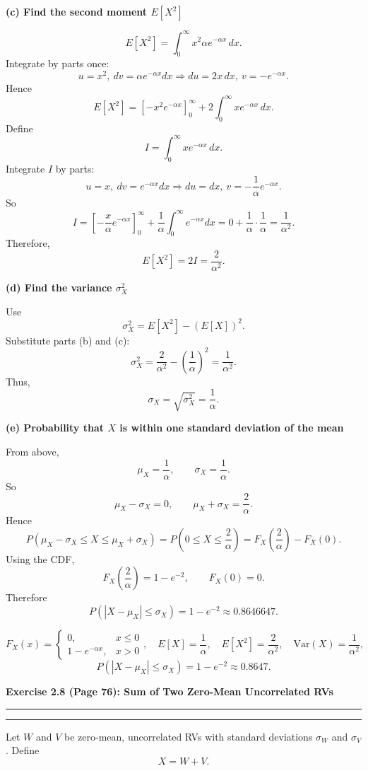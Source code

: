 \documentclass[12pt]{article}
\newcommand{\question}[1]{%
  \clearpage
  \vspace{0.5cm}
  {\noindent\normalsize \textbf{#1}}
  \vspace{0.2cm}
  \hrule
  \vspace{0.1cm}
  \hrule
  \vspace{0.3cm}
}
\begin{document}
\begin{stepbox}
\textbf{(c) Find the second moment $E[X^2]$}

\[
E[X^2]=\int_0^{\infty}x^2\alpha e^{-\alpha x}\,dx.
\]
Integrate by parts once:
\[
u=x^2,\ dv=\alpha e^{-\alpha x}dx
\Rightarrow du=2x\,dx,\ v=-e^{-\alpha x}.
\]
Hence
\[
E[X^2]=\left[-x^2e^{-\alpha x}\right]_0^{\infty}+2\int_0^{\infty}xe^{-\alpha x}\,dx.
\]
Define
\[
I=\int_0^{\infty}xe^{-\alpha x}\,dx.
\]
Integrate $I$ by parts:
\[
u=x,\ dv=e^{-\alpha x}dx
\Rightarrow du=dx,\ v=-\frac{1}{\alpha}e^{-\alpha x}.
\]
So
\[
I=\left[-\frac{x}{\alpha}e^{-\alpha x}\right]_0^{\infty}+\frac{1}{\alpha}\int_0^{\infty}e^{-\alpha x}dx
=0+\frac{1}{\alpha}\cdot\frac{1}{\alpha}
=\frac{1}{\alpha^2}.
\]
Therefore,
\[
E[X^2]=2I=\frac{2}{\alpha^2}.
\]
\end{stepbox}

\begin{stepbox}
\textbf{(d) Find the variance $\sigma_X^2$}

Use
\[
\sigma_X^2=E[X^2]-(E[X])^2.
\]
Substitute parts (b) and (c):
\[
\sigma_X^2=\frac{2}{\alpha^2}-\left(\frac{1}{\alpha}\right)^2
=\frac{1}{\alpha^2}.
\]
Thus,
\[
\sigma_X=\sqrt{\sigma_X^2}=\frac{1}{\alpha}.
\]
\end{stepbox}

\begin{stepbox}
\textbf{(e) Probability that $X$ is within one standard deviation of the mean}

From above,
\[
\mu_X=\frac{1}{\alpha},\qquad \sigma_X=\frac{1}{\alpha}.
\]
So
\[
\mu_X-\sigma_X=0,
\qquad
\mu_X+\sigma_X=\frac{2}{\alpha}.
\]
Hence
\[
P(\mu_X-\sigma_X\le X\le \mu_X+\sigma_X)
=P\left(0\le X\le\frac{2}{\alpha}\right)
=F_X\left(\frac{2}{\alpha}\right)-F_X(0).
\]
Using the CDF,
\[
F_X\left(\frac{2}{\alpha}\right)=1-e^{-2},
\qquad F_X(0)=0.
\]
Therefore
\[
P\left(|X-\mu_X|\le\sigma_X\right)=1-e^{-2}\approx0.8646647.
\]
\end{stepbox}

\begin{resultsbox}
\[
F_X(x)=\begin{cases}0,&x\le0\\1-e^{-\alpha x},&x>0\end{cases},
\quad
E[X]=\frac{1}{\alpha},
\quad
E[X^2]=\frac{2}{\alpha^2},
\quad
\mathrm{Var}(X)=\frac{1}{\alpha^2},
\]
\[
P\left(|X-\mu_X|\le\sigma_X\right)=1-e^{-2}\approx0.8647.
\]
\end{resultsbox}

\question{Exercise 2.8 (Page 76): Sum of Two Zero-Mean Uncorrelated RVs}\label{ex:2.8}
Let $W$ and $V$ be zero-mean, uncorrelated RVs with standard deviations $\sigma_W$ and $\sigma_V$. Define
\[
X=W+V.
\]
\end{document}
